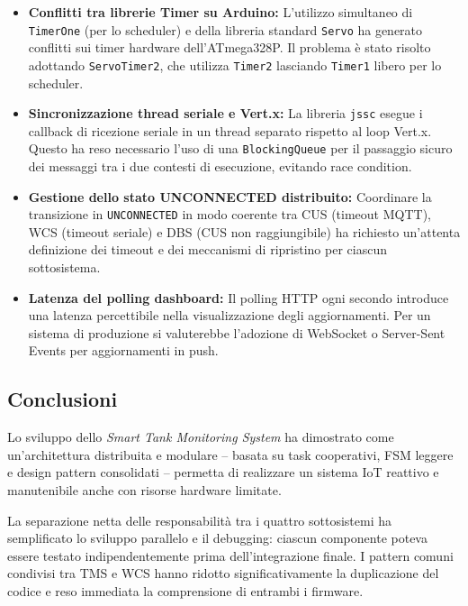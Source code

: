 \documentclass[12pt, a4paper]{article}
\begin{document}
\begin{itemize}
    \item \textbf{Conflitti tra librerie Timer su Arduino:} L'utilizzo simultaneo di \texttt{TimerOne} (per lo scheduler) e della libreria standard \texttt{Servo} ha generato conflitti sui timer hardware dell'ATmega328P. Il problema è stato risolto adottando \texttt{ServoTimer2}, che utilizza \texttt{Timer2} lasciando \texttt{Timer1} libero per lo scheduler.

    \item \textbf{Sincronizzazione thread seriale e Vert.x:} La libreria \texttt{jssc} esegue i callback di ricezione seriale in un thread separato rispetto al loop Vert.x. Questo ha reso necessario l'uso di una \texttt{BlockingQueue} per il passaggio sicuro dei messaggi tra i due contesti di esecuzione, evitando race condition.

    \item \textbf{Gestione dello stato UNCONNECTED distribuito:} Coordinare la transizione in \texttt{UNCONNECTED} in modo coerente tra CUS (timeout MQTT), WCS (timeout seriale) e DBS (CUS non raggiungibile) ha richiesto un'attenta definizione dei timeout e dei meccanismi di ripristino per ciascun sottosistema.

    \item \textbf{Latenza del polling dashboard:} Il polling HTTP ogni secondo introduce una latenza percettibile nella visualizzazione degli aggiornamenti. Per un sistema di produzione si valuterebbe l'adozione di WebSocket o Server-Sent Events per aggiornamenti in push.
\end{itemize}

\subsection{Conclusioni}

Lo sviluppo dello \textit{Smart Tank Monitoring System} ha dimostrato come un'architettura distribuita e modulare -- basata su task cooperativi, FSM leggere e design pattern consolidati -- permetta di realizzare un sistema IoT reattivo e manutenibile anche con risorse hardware limitate.

La separazione netta delle responsabilità tra i quattro sottosistemi ha semplificato lo sviluppo parallelo e il debugging: ciascun componente poteva essere testato indipendentemente prima dell'integrazione finale. I pattern comuni condivisi tra TMS e WCS hanno ridotto significativamente la duplicazione del codice e reso immediata la comprensione di entrambi i firmware.
\end{document}
